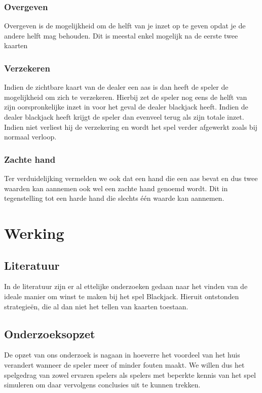 \documentclass[conference]{IEEEtran}
\begin{document}
\subsubsection{Overgeven}
Overgeven is de mogelijkheid om de helft van je inzet op te geven opdat je de andere helft mag behouden. Dit is meestal enkel mogelijk na de eerste twee kaarten

\subsubsection{Verzekeren}
Indien de zichtbare kaart van de dealer een aas is dan heeft de speler de mogelijkheid om zich te verzekeren. Hierbij zet de speler nog eens de helft van zijn oorspronkelijke inzet in voor het geval de dealer blackjack heeft. Indien de dealer blackjack heeft krijgt de speler dan evenveel terug als zijn totale inzet. Indien niet verliest hij de verzekering en wordt het spel verder afgewerkt zoals bij normaal verloop.

\subsubsection{Zachte hand}
Ter verduidelijking vermelden we ook dat een hand die een aas bevat en dus twee waarden kan aannemen ook wel een zachte hand genoemd wordt. Dit in tegenstelling tot een harde hand die slechts \'e\'en waarde kan aannemen.

\section{Werking}
\subsection{Literatuur}
In de literatuur zijn er al ettelijke onderzoeken gedaan naar het vinden van de ideale manier om winst te maken bij het spel Blackjack.
Hieruit ontstonden strategieën, die al dan niet het tellen van kaarten toestaan. \cite{thorp1961favorable} \cite{baldwin1956optimum} \cite{fogel2004evolving}

\subsection{Onderzoeksopzet}
De opzet van ons onderzoek is nagaan in hoeverre het voordeel van het huis verandert wanneer de speler meer of minder fouten maakt. We willen dus het spelgedrag van zowel ervaren spelers als spelers met beperkte kennis van het spel simuleren om daar vervolgens conclusies uit te kunnen trekken.
\end{document}
